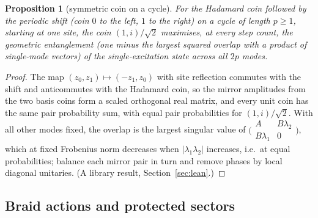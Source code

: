 \documentclass[aps,pra,onecolumn,superscriptaddress,nofootinbib,10pt]{revtex4-2}
\newtheorem{proposition}[theorem]{Proposition}
\theoremstyle{definition}
\theoremstyle{remark}
\begin{document}
\begin{proposition}[symmetric coin on a cycle]\label{prop:cpcoin}
For the Hadamard coin followed by the periodic shift (coin $0$ to the left, $1$ to the right) on a cycle of length $p\ge1$, starting at one
site, the coin $(1,i)/\sqrt2$ maximises, at every step count, the geometric entanglement (one minus the largest squared overlap with a
product of single-mode vectors) of the single-excitation state across all $2p$ modes.
\end{proposition}
\begin{proof}
The map $(z_0,z_1)\mapsto(-z_1,z_0)$ with site reflection commutes with the shift and anticommutes with the Hadamard coin, so the mirror
amplitudes from the two basis coins form a scaled orthogonal real matrix, and every unit coin has the same pair probability sum, with
equal pair probabilities for $(1,i)/\sqrt2$.  With all other modes fixed, the overlap is the largest singular value of
$\bigl(\begin{smallmatrix}A&B\lambda_2\\ B\lambda_1&0\end{smallmatrix}\bigr)$, which at fixed Frobenius norm decreases when $\lvert\lambda_1\lambda_2\rvert$ increases, i.e.\ at equal probabilities; balance each
mirror pair in turn and remove phases by local diagonal unitaries.  (A library result, Section~\ref{sec:lean}.)
\end{proof}

\subsection{Braid actions and protected sectors}
\end{document}
